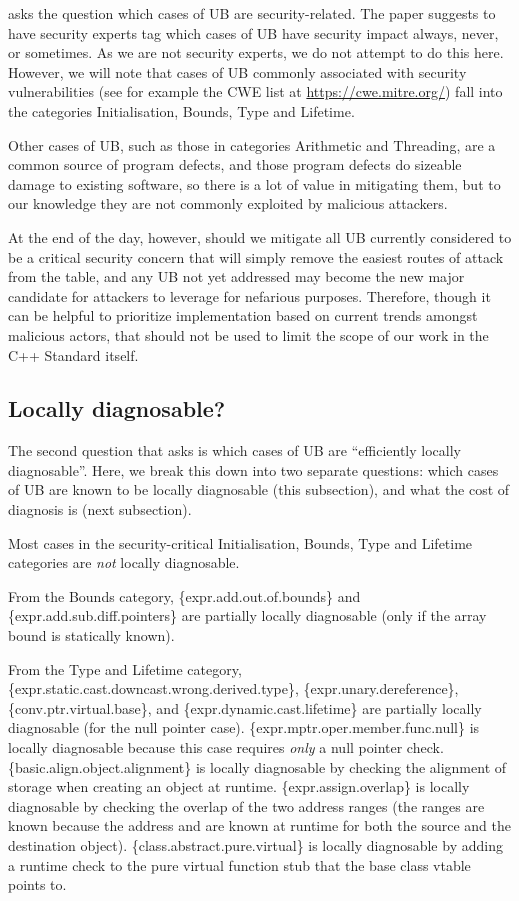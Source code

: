 \cite{P3656R1} asks the question which cases of UB are security-related. The paper suggests to have security experts tag which cases of UB have security impact always, never, or sometimes. As we are not security experts, we do not attempt to do this here. However, we will note that cases of UB commonly associated with security vulnerabilities (see for example the CWE list at \url{https://cwe.mitre.org/}) fall into the categories Initialisation, Bounds, Type and Lifetime. 

Other cases of UB, such as those in categories Arithmetic and Threading, are a common source of program defects, and those program defects do sizeable damage to existing software, so there is a lot of value in mitigating them, but to our knowledge they are not commonly exploited by malicious attackers.

At the end of the day, however, should we mitigate all UB currently considered to be a critical security concern that will simply remove the easiest routes of attack from the table, and any UB not yet addressed may become the new major candidate for attackers to leverage for nefarious purposes.  Therefore, though it can be helpful to prioritize implementation based on current trends amongst malicious actors, that should not be used to limit the scope of our work in the C++ Standard itself.

\subsection{Locally diagnosable?}
\label{locally}

The second question that \cite{P3656R1} asks is which cases of UB are ``efficiently locally diagnosable''. Here, we break this down into two separate questions: which cases of UB are known to be locally diagnosable (this subsection), and what the cost of diagnosis is (next subsection).

Most cases in the security-critical Initialisation, Bounds, Type and Lifetime categories are \emph{not} locally diagnosable. 

From the Bounds category, 
\{expr.add.out.of.bounds\} 
and \{expr.add.sub.diff.pointers\} 
are partially locally diagnosable (only if the array bound is statically known).

From the Type and Lifetime category,
\{expr.static.cast.downcast.wrong.derived.type\},
\{expr.unary.dereference\},
\{conv.ptr.virtual.base\}, and
\{expr.dynamic.cast.lifetime\}
are partially locally diagnosable (for the null pointer case).
\{expr.mptr.oper.member.func.null\} is locally diagnosable because this case requires \emph{only} a null pointer check.
\{basic.align.object.alignment\} is locally diagnosable by checking the alignment of storage when creating an object at runtime.
\{expr.assign.overlap\} is locally diagnosable by checking the overlap of the two address ranges (the ranges are known because the address and  are known at runtime for both the source and the destination object). \{class.abstract.pure.virtual\} is locally diagnosable by adding a runtime check to  the pure virtual function stub that the base class vtable points to.

